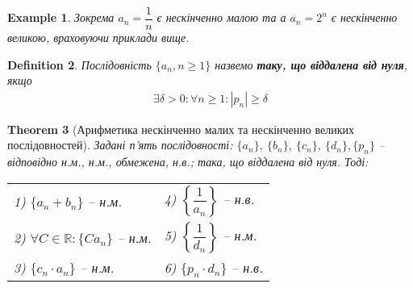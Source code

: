 \documentclass[a4paper, 14pt]{article}
\theoremstyle{theoremdd}
\newtheorem{theorem}{Theorem}[subsection]
\theoremstyle{theoremdd}
\newtheorem{definition}[theorem]{Definition}
\theoremstyle{theoremdd}
\theoremstyle{theoremdd}
\newtheorem{example}[theorem]{Example}
\theoremstyle{theoremdd}
\theoremstyle{theoremdd}
\theoremstyle{theoremdd}
\theoremstyle{theoremdd}
\begin{document}
	\begin{example}
	Зокрема $a_n = \dfrac{1}{n}$ є нескінченно малою та а $a_n = 2^n$ є нескінченно великою, враховуючи приклади вище.
	\end{example}
	
	\begin{definition}
	Послідовність $\{a_n, n \geq 1\}$ назвемо \textbf{таку, що віддалена від нуля}, якщо
	\begin{align*}
	\exists \delta>0: \forall n\geq 1: |p_n|\geq \delta
	\end{align*}
	\end{definition}
	
	\begin{theorem}[Арифметика нескінченно малих та нескінченно великих послідовностей]
	Задані п'ять послідовності: $\{a_n\}, \ \{b_n\},\ \{c_n\},\ \{d_n\}, \{p_n\}$ -- відповідно н.м., н.м., обмежена, н.в.; така, що віддалена від нуля. Тоді:\\
	\begin{tabular}{ll}
	1) $\{a_n+b_n\}$ -- н.м. & 4) $\left\{ \dfrac{1}{a_n} \right\}$ -- н.в. \\
	2) $\forall C \in \mathbb{R}: \{C a_n\}$ -- н.м. & 5) $\left\{ \dfrac{1}{d_n} \right\}$ -- н.м. \\
	3) $\{c_n \cdot a_n\}$ -- н.м. & 6) $\{p_n \cdot d_n \}$ -- н.в.
	\end{tabular}
	\end{theorem}
	
\end{document}
